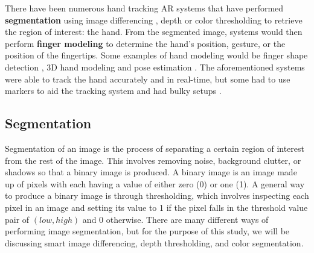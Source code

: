 \documentclass{acm_proc_article-sp}
\begin{document}
There have been numerous hand tracking AR systems that have performed \textbf{segmentation} using image differencing \cite{Hardenberg:2001, Song:2008}, depth \cite{Kulshreshth:2013, Raheja:2011} or color thresholding \cite{Byron:2009, Gumpp:2006} to retrieve the region of interest: the hand. From the segmented image, systems would then perform \textbf{finger modeling} to determine the hand's position, gesture, or the position of the fingertips. Some examples of hand modeling would be finger shape detection \cite{Song:2008,Hardenberg:2001}, 3D hand modeling \cite{Byron:2009, Gumpp:2006} and pose estimation \cite{SchlattmannKahlesz:2007, Wang:2011}. The aforementioned systems were able to track the hand accurately and in real-time, but some had to use markers to aid the tracking system \cite{Chun:2013, Refinger:2007, Huynh:2009} and had bulky setups \cite{SchlattmannKahlesz:2007, Wang:2011}.


\subsection{Segmentation}

Segmentation of an image is the process of separating a certain region of interest from the rest of the image. This involves removing noise, background clutter, or shadows so that a binary image is produced. A binary image is an image made up of pixels with each having a value of either zero (0) or one (1). A general way to produce a binary image is through thresholding, which involves inspecting each pixel in an image and setting its value to 1 if the pixel falls in the threshold value pair of \( (low, high) \) and 0 otherwise. There are many different ways of performing image segmentation, but for the purpose of this study, we will be discussing smart image differencing, depth thresholding, and color segmentation.
\end{document}
